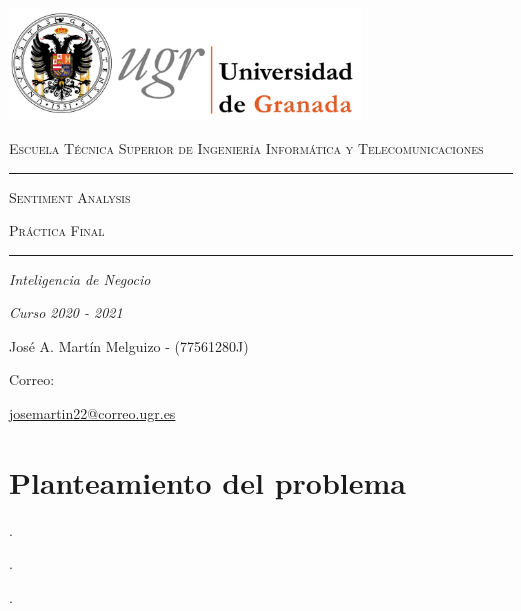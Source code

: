 \documentclass[a4paper,12pt]{report}
\begin{document}
\begin{titlepage}
    \centering
    {\includegraphics[width=0.7\textwidth]{images/ugr.jpeg}\par}
    \vspace{1cm}
    {\scshape\Large Escuela Técnica Superior de Ingeniería Informática y Telecomunicaciones \par}
    \vspace{2.5cm}
    \hrule height 0.5pt
    \vspace{0.5cm}
    {\scshape\Huge Sentiment Analysis \par}
    \vspace{1cm}
    {\scshape\large Práctica Final \par}
    \vspace{0.5cm}
    \hrule height 0.5pt
    \vspace{4cm}
    {\itshape\Large Inteligencia de Negocio \par}
    \vspace{0.2cm}
    {\itshape\Large Curso 2020 - 2021 \par}
    \vfill
    {\Large José A. Martín Melguizo - (77561280J) \par}
    \vspace{0.5cm}
    {\large Correo:} {\href{correo}{josemartin22@correo.ugr.es} \par}
    \vfill
    
\end{titlepage}


\clearpage
\tableofcontents
\clearpage

\chapter{Planteamiento del problema}

.

\clearpage


.

\clearpage 

.

\clearpage
\end{document}
